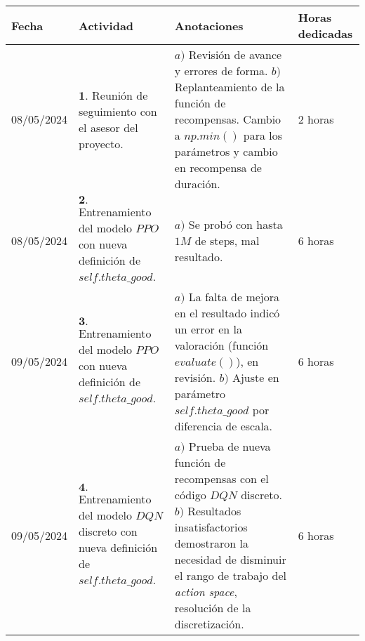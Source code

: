 \documentclass[12pt]{article}
\begin{document}
\begin{minipage}[h]{\textwidth}
	\centering
	\begin{tabularx}{\textwidth}{|p{2cm}|X|X|p{2cm}|} 
		\hline
		\rowcolor{encabezado}
		\textbf{Fecha} & 
		\textbf{Actividad} & 
		\textbf{Anotaciones} & 
		\textbf{Horas dedicadas} \\ \hline
	 	08/05/2024 & 
	 	$\mathbf{1}.$ Reunión de seguimiento con el asesor del proyecto. & 
	 	$a)$ Revisión de avance y errores de forma. \newline
	 	$b)$ Replanteamiento de la función de recompensas. Cambio a $np.min()$ para los parámetros y cambio en recompensa de duración. \newline & 
	 	2 horas \\
	 	08/05/2024 & 
	 	$\mathbf{2}.$ Entrenamiento del modelo $PPO$ con nueva definición de $self.theta\_good$. & 
	 	$a)$ Se probó con hasta $1M$ de steps, mal resultado. \newline & 
	 	6 horas \\
	 	09/05/2024 & 
	 	$\mathbf{3}.$ Entrenamiento del modelo $PPO$ con nueva definición de $self.theta\_good$. & 
	 	$a)$ La falta de mejora en el resultado indicó un error en la valoración (función $evaluate()$), en revisión. \newline
	 	$b)$ Ajuste en parámetro $self.theta\_good$ por diferencia de escala. \newline & 
	 	6 horas \\
	 	09/05/2024 & 
	 	$\mathbf{4}.$ Entrenamiento del modelo $DQN$ discreto con nueva definición de $self.theta\_good$. & 
	 	$a)$ Prueba de nueva función de recompensas con el código $DQN$ discreto. \newline
	 	$b)$ Resultados insatisfactorios demostraron la necesidad de disminuir el rango de trabajo del \textit{action space}, resolución de la discretización. \newline & 
	 	6 horas \\

	 	\hline
	\end{tabularx}
\end{minipage}	 	
	 	
\end{document}
